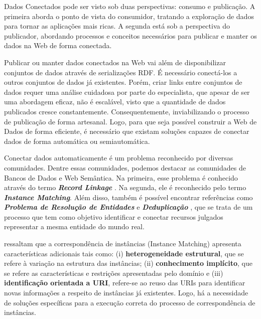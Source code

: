 Dados Conectados pode ser visto sob duas perspectivas: consumo e publicação. A primeira aborda o ponto de vista do consumidor, tratando a exploração de dados para tornar as aplicações mais ricas. A segunda está sob a perspectiva do publicador, abordando processos \cite{bizer2007publish, hyland2011joy, villazon2011methodological, Avila2015} e conceitos \cite{berners2006linked, wood2014linked} necessários para publicar e manter os dados na Web de forma conectada. 

Publicar ou manter dados conectados na Web vai além de disponibilizar conjuntos de dados através de serializações RDF. É necessário conectá-los a outros conjuntos de dados já existentes. Porém, criar links entre conjuntos de dados requer uma análise cuidadosa por parte do especialista, que apesar de ser uma abordagem eficaz, não é escalável, visto que a quantidade de dados publicados cresce constantemente. Consequentemente, inviabilizando o processo de publicação de forma artesanal. Logo, para que seja possível construir a Web de Dados de forma eficiente, é necessário que existam soluções capazes de conectar dados de forma automática ou semiautomática.

Conectar dados automaticamente é um problema reconhecido por diversas comunidades. Dentre essas comunidades, podemos destacar as comunidades de Bancos de Dados e Web Semântica. Na primeira, esse problema é conhecido através do termo \textbf{\textit{Record Linkage}} \cite{gu2003record}. Na segunda, ele é reconhecido pelo termo \textbf{\textit{Instance Matching}}. Além disso, também é possível encontrar referências como \textbf{\textit{Problema de Resolução de Entidades}} \cite{menestrina2005generic} e \textbf{\textit{Deduplicação}} \cite{sarawagi2002interactive}, que se trata de um processo que tem como objetivo identificar e conectar recursos julgados representar a mesma entidade do mundo real.

 ressaltam que a correspondência de instâncias (Instance Matching) apresenta características adicionais tais como: (i) \textbf{heterogeneidade estrutural}, que se refere à variação na estrutura das instâncias; (ii)\textbf{ conhecimento implícito}, que se refere as características e restrições  apresentadas pelo domínio e (iii) \textbf{identificação orientada a URI}, refere-se ao reuso das URIs para identificar novas informações a respeito de instâncias já existentes. Logo, há a necessidade de soluções específicas para a execução correta do processo de correspondência de instâncias. 

